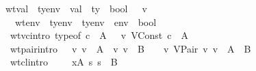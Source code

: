 \begin{isabellebody}
\isanewline
{}\isamarkupfalse \ wt{\isacharunderscore}val\ {\isacharcolon}{\isacharcolon}\ {\isachardoublequoteopen}ty{\isacharunderscore}env\ {\isasymRightarrow}\ val\ {\isasymRightarrow}\ ty\ {\isasymRightarrow}\ bool{\isachardoublequoteclose}\ \ {\isacharparenleft}{\isachardoublequoteopen}{\isacharunderscore}\ {\isasymturnstile}v\ {\isacharunderscore}\ {\isacharcolon}\ {\isacharunderscore}{\isachardoublequoteclose}\ {\isacharbrackleft}{}{}{\isacharcomma}{}{}{\isacharcomma}{}{}{\isacharbrackright}\ {}{}{\isacharparenright}\ \isanewline
\ \ \ wt{\isacharunderscore}env\ {\isacharcolon}{\isacharcolon}\ {\isachardoublequoteopen}ty{\isacharunderscore}env\ {\isasymRightarrow}\ ty{\isacharunderscore}env\ {\isasymRightarrow}\ env\ {\isasymRightarrow}\ bool{\isachardoublequoteclose}\ {\isacharparenleft}{\isachardoublequoteopen}{\isacharunderscore}{\isacharsemicolon}{\isacharunderscore}\ {\isasymturnstile}\ {\isacharunderscore}{\isachardoublequoteclose}\ {\isacharbrackleft}{}{}{\isacharcomma}{}{}{\isacharcomma}{}{}{\isacharbrackright}\ {}{}{\isacharparenright}\ \isanewline
\ \ wt{\isacharunderscore}vc{\isacharbrackleft}intro{\isacharbang}{\isacharbrackright}{\isacharcolon}\ {\isachardoublequoteopen}typeof\ c\ {\isacharequal}\ A\ {\isasymLongrightarrow}\ {\isasymSigma}\ {\isasymturnstile}v\ VConst\ c\ {\isacharcolon}\ A{\isachardoublequoteclose}\ {\isacharbar}\isanewline
\ \ wt{\isacharunderscore}pair{\isacharbrackleft}intro{\isacharbang}{\isacharbrackright}{\isacharcolon}\ {\isachardoublequoteopen}{\isasymlbrakk}\ {\isasymSigma}\ {\isasymturnstile}v\ v\ {\isacharcolon}\ A{\isacharsemicolon}\ {\isasymSigma}\ {\isasymturnstile}v\ v{\isacharprime}\ {\isacharcolon}\ B\ {\isasymrbrakk}\ {\isasymLongrightarrow}\ {\isasymSigma}\ {\isasymturnstile}v\ {\isacharparenleft}VPair\ v\ v{\isacharprime}{\isacharparenright}\ {\isacharcolon}\ A\ {\isasymtimes}\ B{\isachardoublequoteclose}\ {\isacharbar}\isanewline
\ \ wt{\isacharunderscore}cl{\isacharbrackleft}intro{\isacharbang}{\isacharbrackright}{\isacharcolon}\ {\isachardoublequoteopen}{\isasymlbrakk}\ {\isasymGamma}{\isacharsemicolon}{\isasymSigma}\ {\isasymturnstile}\ {\isasymrho}{\isacharsemicolon}\ {\isacharparenleft}x{\isacharcomma}A{\isacharparenright}{\isacharhash}{\isasymGamma}\ {\isasymturnstile}\isactrlisub s\ s\ {\isacharcolon}\ B\ {\isasymrbrakk}\ {\isasymLongrightarrow}\ \isanewline

\end{isabellebody}
